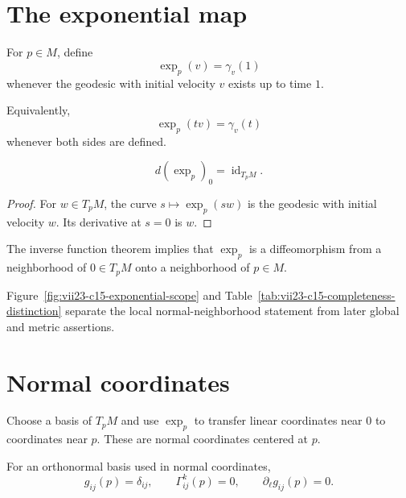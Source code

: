 \section{The exponential map}

\begin{definition}\label{def:vii23-exp}
For \(p\in M\), define
\[
\exp_p(v)=\gamma_v(1)
\]
whenever the geodesic with initial velocity \(v\) exists up to time \(1\).
\end{definition}

Equivalently,
\[
\exp_p(tv)=\gamma_v(t)
\]
whenever both sides are defined.

\begin{proposition}\label{prop:vii23-exp-derivative}
\[
d(\exp_p)_0=\operatorname{id}_{T_pM}.
\]
\end{proposition}

\begin{proof}
For \(w\in T_pM\), the curve \(s\mapsto\exp_p(sw)\) is the geodesic with initial
velocity \(w\).  Its derivative at \(s=0\) is \(w\).
\end{proof}

\begin{corollary}\label{cor:vii23-normal-neighborhood}
The inverse function theorem implies that \(\exp_p\) is a diffeomorphism from a
neighborhood of \(0\in T_pM\) onto a neighborhood of \(p\in M\).
\end{corollary}

Figure~\ref{fig:vii23-c15-exponential-scope} and
Table~\ref{tab:vii23-c15-completeness-distinction} separate the local
normal-neighborhood statement from later global and metric assertions.


\section{Normal coordinates}

\begin{definition}\label{def:vii23-normal-coordinates}
Choose a basis of \(T_pM\) and use \(\exp_p\) to transfer linear coordinates near
\(0\) to coordinates near \(p\).  These are normal coordinates centered at \(p\).
\end{definition}

\begin{theorem}\label{thm:vii23-normal-metric}
For an orthonormal basis used in normal coordinates,
\[
g_{ij}(p)=\delta_{ij},
\qquad
\Gamma^k_{ij}(p)=0,
\qquad
\partial_\ell g_{ij}(p)=0.
\]
\end{theorem}

